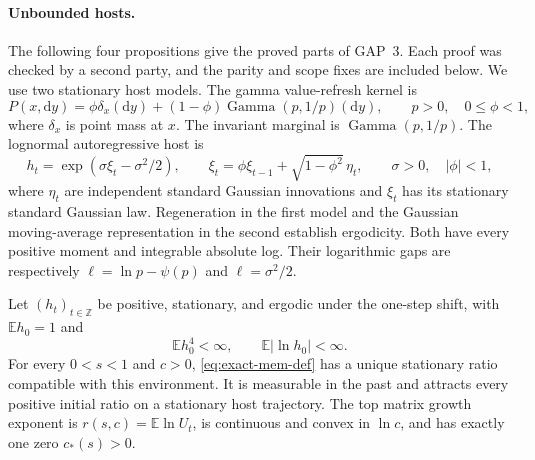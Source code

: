\paragraph{Unbounded hosts.}
The following four propositions give the proved parts of GAP~3. Each
proof was checked by a second party, and the parity and scope fixes
are included below. We use two stationary host models. The gamma
value-refresh kernel is
\begin{equation}
 P(x,\mathrm d y)=\phi\delta_x(\mathrm d y)
 +(1-\phi)\operatorname{Gamma}(p,1/p)(\mathrm d y),
 \qquad p>0,\quad 0\leq\phi<1,
 \label{eq:exact-mem-refresh}
\end{equation}
where $\delta_x$ is point mass at $x$. The invariant marginal is
$\operatorname{Gamma}(p,1/p)$. The lognormal autoregressive host is
\begin{equation}
 h_t=\exp(\sigma\xi_t-\sigma^2/2),\qquad
 \xi_t=\phi\xi_{t-1}+\sqrt{1-\phi^2}\,\eta_t,
 \qquad \sigma>0,\quad |\phi|<1,
 \label{eq:exact-mem-lognormal}
\end{equation}
where $\eta_t$ are independent standard Gaussian innovations and
$\xi_t$ has its stationary standard Gaussian law. Regeneration in
the first model and the Gaussian moving-average representation in the
second establish ergodicity. Both have every positive moment and
integrable absolute log. Their logarithmic gaps are respectively
$\ell=\ln p-\psi(p)$ and $\ell=\sigma^2/2$.

\begin{proposition}
\label{prop:exact-mem-unbounded-root}
Let $(h_t)_{t\in\mathbb Z}$ be positive, stationary, and ergodic under
the one-step shift, with $\mathbb E h_0=1$ and
\begin{equation}
 \mathbb E h_0^4<\infty,\qquad \mathbb E|\ln h_0|<\infty.
 \label{eq:exact-mem-H4}
\end{equation}
For every $0<s<1$ and $c>0$, \eqref{eq:exact-mem-def} has a unique
stationary ratio compatible with this environment. It is measurable
in the past and attracts every positive initial ratio on a stationary
host trajectory. The top matrix growth exponent is
$r(s,c)=\mathbb E\ln U_t$, is continuous and convex in $\ln c$, and
has exactly one zero $c_*(s)>0$.
\end{proposition}

